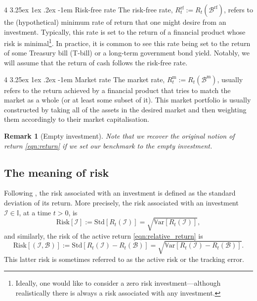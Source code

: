\documentclass[12pt]{article}
\makeatletter
\newtheorem{remark}{Remark}[section]
\renewcommand\paragraph{%
	\@startsection{paragraph}
	{4}
	{\z@}
	{3.25ex \@plus1ex \@minus.2ex}
	{-1em}
	{\normalfont\normalsize\bfseries\maybe@addperiod}%
}
\newcommand{\maybe@addperiod}[1]{%
	#1\@addpunct{.}%
}
\makeatother
\begin{document}
\paragraph{Risk-free rate} The risk-free rate, $R_t^{\text{rf}} := R_t(\mathcal{B}^{\text{rf}})$, refers to the (hypothetical) minimum rate of return that one might desire from an investment. Typically, this rate is set to the return of a financial product whose risk is minimal\footnote{Ideally, one would like to consider a zero risk investment---although realistically there is always a risk associated with any investment.}. In practice, it is common to see this rate being set to the return of some Treasury bill (T-bill) or a long-term government bond yield. Notably, we will assume that the return of cash follows the risk-free rate.

\paragraph{Market rate} The market rate, $R_t^{\text{m}} := R_t(\mathcal{B}^{\text{m}})$, usually refers to the return achieved by a financial product that tries to match the market as a whole (or at least some subset of it). This market portfolio is usually constructed by taking all of the assets in the desired market and then weighting them accordingly to their market capitalisation.

\begin{remark}
	[Empty investment] Note that we recover the original notion of return \eqref{eqn:return} if we set our benchmark to the empty investment.
\end{remark}

\subsection{The meaning of risk}
Following \cite{grinold1999}, the risk associated with an investment is defined as the standard deviation of its return. More precisely, the risk associated with an investment $\mathcal{I} \in \mathbb{I}$, at a time $t > 0$, is
\begin{equation}
	\text{Risk}[\mathcal{I}] := \text{Std}[R_t(\mathcal{I})] = \sqrt{\mathbb{V}\text{ar}[R_t(\mathcal{I})]},
\end{equation}
and similarly, the risk of the active return \eqref{eqn:relative_return} is 
\begin{equation}
	\text{Risk}[(\mathcal{I}, \mathcal{B})] := \text{Std}[R_t(\mathcal{I}) - R_t(\mathcal{B})] = \sqrt{\mathbb{V}\text{ar}[R_t(\mathcal{I}) - R_t(\mathcal{B})]}.
\end{equation}
This latter risk is sometimes referred to as the active risk or the tracking error.
\end{document}
